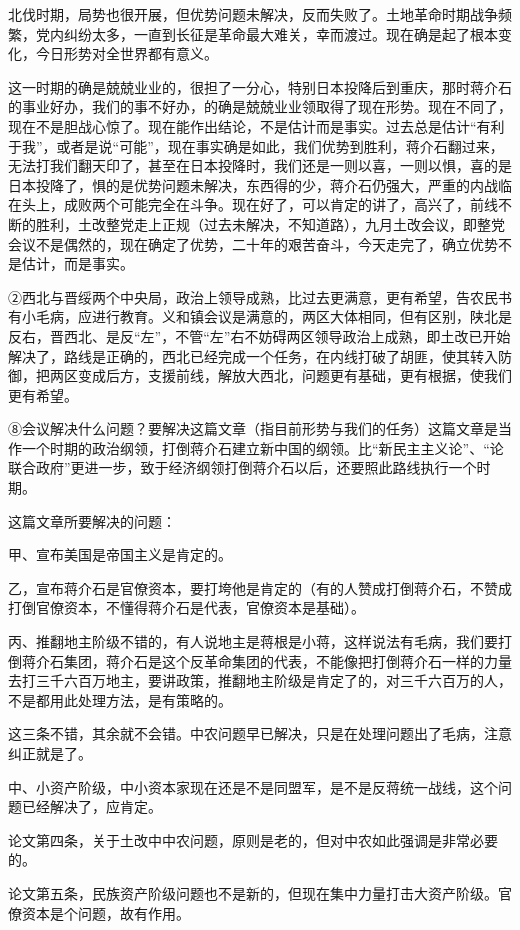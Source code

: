 北伐时期，局势也很开展，但优势问题未解决，反而失败了。土地革命时期战争频繁，党内纠纷太多，一直到长征是革命最大难关，幸而渡过。现在确是起了根本变化，今日形势对全世界都有意义。

这一时期的确是兢兢业业的，很担了一分心，特别日本投降后到重庆，那时蒋介石的事业好办，我们的事不好办，的确是兢兢业业领取得了现在形势。现在不同了，现在不是胆战心惊了。现在能作出结论，不是估计而是事实。过去总是估计“有利于我”，或者是说“可能”，现在事实确是如此，我们优势到胜利，蒋介石翻过来，无法打我们翻天印了，甚至在日本投降时，我们还是一则以喜，一则以惧，喜的是日本投降了，惧的是优势问题未解决，东西得的少，蒋介石仍强大，严重的内战临在头上，成败两个可能完全在斗争。现在好了，可以肯定的讲了，高兴了，前线不断的胜利，土改整党走上正规（过去未解决，不知道路），九月土改会议，即整党会议不是偶然的，现在确定了优势，二十年的艰苦奋斗，今天走完了，确立优势不是估计，而是事实。

②西北与晋绥两个中央局，政治上领导成熟，比过去更满意，更有希望，告农民书有小毛病，应进行教育。义和镇会议是满意的，两区大体相同，但有区别，陕北是反右，晋西北、是反“左”，不管“左”右不妨碍两区领导政治上成熟，即土改已开始解决了，路线是正确的，西北已经完成一个任务，在内线打破了胡匪，使其转入防御，把两区变成后方，支援前线，解放大西北，问题更有基础，更有根据，使我们更有希望。

⑧会议解决什么问题？要解决这篇文章（指目前形势与我们的任务）这篇文章是当作一个时期的政治纲领，打倒蒋介石建立新中国的纲领。比“新民主主义论”、“论联合政府”更进一步，致于经济纲领打倒蒋介石以后，还要照此路线执行一个时期。

这篇文章所要解决的问题：

甲、宣布美国是帝国主义是肯定的。

乙，宣布蒋介石是官僚资本，要打垮他是肯定的（有的人赞成打倒蒋介石，不赞成打倒官僚资本，不懂得蒋介石是代表，官僚资本是基础）。

丙、推翻地主阶级不错的，有人说地主是蒋根是小蒋，这样说法有毛病，我们要打倒蒋介石集团，蒋介石是这个反革命集团的代表，不能像把打倒蒋介石一样的力量去打三千六百万地主，要讲政策，推翻地主阶级是肯定了的，对三千六百万的人，不是都用此处理方法，是有策略的。

这三条不错，其余就不会错。中农问题早已解决，只是在处理问题出了毛病，注意纠正就是了。

中、小资产阶级，中小资本家现在还是不是同盟军，是不是反蒋统一战线，这个问题已经解决了，应肯定。

论文第四条，关于土改中中农问题，原则是老的，但对中农如此强调是非常必要的。

论文第五条，民族资产阶级问题也不是新的，但现在集中力量打击大资产阶级。官僚资本是个问题，故有作用。

